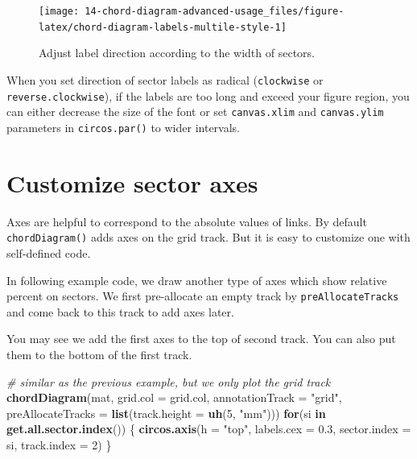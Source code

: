 \documentclass[]{book}
\newenvironment{Shaded}{\begin{snugshade}}{\end{snugshade}}
\newcommand{\KeywordTok}[1]{\textcolor[rgb]{0.13,0.29,0.53}{\textbf{#1}}}
\newcommand{\DataTypeTok}[1]{\textcolor[rgb]{0.13,0.29,0.53}{#1}}
\newcommand{\DecValTok}[1]{\textcolor[rgb]{0.00,0.00,0.81}{#1}}
\newcommand{\FloatTok}[1]{\textcolor[rgb]{0.00,0.00,0.81}{#1}}
\newcommand{\StringTok}[1]{\textcolor[rgb]{0.31,0.60,0.02}{#1}}
\newcommand{\CommentTok}[1]{\textcolor[rgb]{0.56,0.35,0.01}{\textit{#1}}}
\newcommand{\ControlFlowTok}[1]{\textcolor[rgb]{0.13,0.29,0.53}{\textbf{#1}}}
\newcommand{\NormalTok}[1]{#1}
\begin{document}
\begin{figure}

{\centering \texttt{[image: 14-chord-diagram-advanced-usage\_files/figure-latex/chord-diagram-labels-multile-style-1]} 

}

\caption{Adjust label direction according to the width of sectors.}\label{fig:chord-diagram-labels-multile-style}
\end{figure}

When you set direction of sector labels as radical (\texttt{clockwise}
or \texttt{reverse.clockwise}), if the labels are too long and exceed
your figure region, you can either decrease the size of the font or set
\texttt{canvas.xlim} and \texttt{canvas.ylim} parameters in
\texttt{circos.par()} to wider intervals.

\section{Customize sector axes}\label{customize-sector-axes}

Axes are helpful to correspond to the absolute values of links. By
default \texttt{chordDiagram()} adds axes on the grid track. But it is
easy to customize one with self-defined code.

In following example code, we draw another type of axes which show
relative percent on sectors. We first pre-allocate an empty track by
\texttt{preAllocateTracks} and come back to this track to add axes
later.

You may see we add the first axes to the top of second track. You can
also put them to the bottom of the first track.

\begin{Shaded}
\begin{Highlighting}[]
\CommentTok{# similar as the previous example, but we only plot the grid track}
\KeywordTok{chordDiagram}\NormalTok{(mat, }\DataTypeTok{grid.col =}\NormalTok{ grid.col, }\DataTypeTok{annotationTrack =} \StringTok{"grid"}\NormalTok{, }
    \DataTypeTok{preAllocateTracks =} \KeywordTok{list}\NormalTok{(}\DataTypeTok{track.height =} \KeywordTok{uh}\NormalTok{(}\DecValTok{5}\NormalTok{, }\StringTok{"mm"}\NormalTok{)))}
\ControlFlowTok{for}\NormalTok{(si }\ControlFlowTok{in} \KeywordTok{get.all.sector.index}\NormalTok{()) \{}
    \KeywordTok{circos.axis}\NormalTok{(}\DataTypeTok{h =} \StringTok{"top"}\NormalTok{, }\DataTypeTok{labels.cex =} \FloatTok{0.3}\NormalTok{, }\DataTypeTok{sector.index =}\NormalTok{ si, }\DataTypeTok{track.index =} \DecValTok{2}\NormalTok{)}
\NormalTok{\}}
\end{Highlighting}
\end{Shaded}
\end{document}
